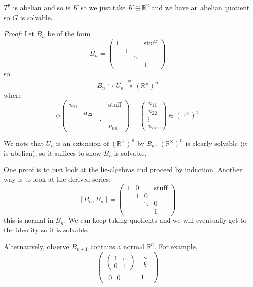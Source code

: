 \documentclass[12pt]{article}
\newcommand{\R}{\mathbb{R}}
\newenvironment*{tbox}[2][gray]{
    \begin{tcolorbox}[
        parbox=false,
        colback=#1!5!white,
        colframe=#1!75!black,
        breakable,
        title={#2}
    ]}
    {\end{tcolorbox}}
\begin{document}
    $T^2$ is abelian and so is $K$ so we just take $K \oplus \R^2$ and we have an abelian quotient so $G$ is solvable.

    \begin{tbox}{\textbf{Claim:} The upper triangular matrices ($U_n$) are solvable}
        \emph{Proof:} Let $B_n$ be of the form 
        \[B_n = \begin{pmatrix}
            1 & & & \text{stuff}\\ 
            & 1\\ 
            & & \ddots\\ 
            & & & 1
        \end{pmatrix}\]
        so 
        \[B_n \hookrightarrow U_n \overset{\phi}{\twoheadrightarrow} (\R^{\times})^n\]
        where 
        \[\phi\begin{pmatrix}
            u_{11} & & & \text{stuff}\\ 
            & u_{22}\\ 
            & & \ddots\\
            & & & u_{nn}
        \end{pmatrix} = \begin{pmatrix}
            u_{11}\\ 
            u_{22}\\ 
            \vdots\\ 
            u_{nn}
        \end{pmatrix} \in (\R^{\times})^n\]

        We note that $U_n$ is an extension of $(\R^{\times})^n$ by $B_n$. $(\R^{\times})^n$ is clearly solvable (it is abelian), so it suffices to show $B_n$ is solvable. 

        One proof is to just look at the lie-algebras and proceed by induction.  Another way is to look at the derived series: 
        \[[B_n, B_n] = \begin{pmatrix}
            1 & 0 & & \text{stuff}\\ 
            & 1 & 0\\ 
            & & \ddots & 0\\ 
            & & & 1
        \end{pmatrix}\]
        this is normal in $B_n$. We can keep taking quotients and we will eventually get to the identity so it is solvable. 

        Alternatively, observe $B_{n+1}$ contains a normal $\R^n$. For example, 
        \[\left(\begin{array}{cc|c}
            \begin{pmatrix}
                1 & c\\ 
                0 & 1
            \end{pmatrix} & \begin{matrix}
                a\\b
            \end{matrix}\\
            \hline
            \begin{matrix}
                0 & 0
            \end{matrix} & 1
        \end{array}\right)\]


\end{tbox}
\end{document}
